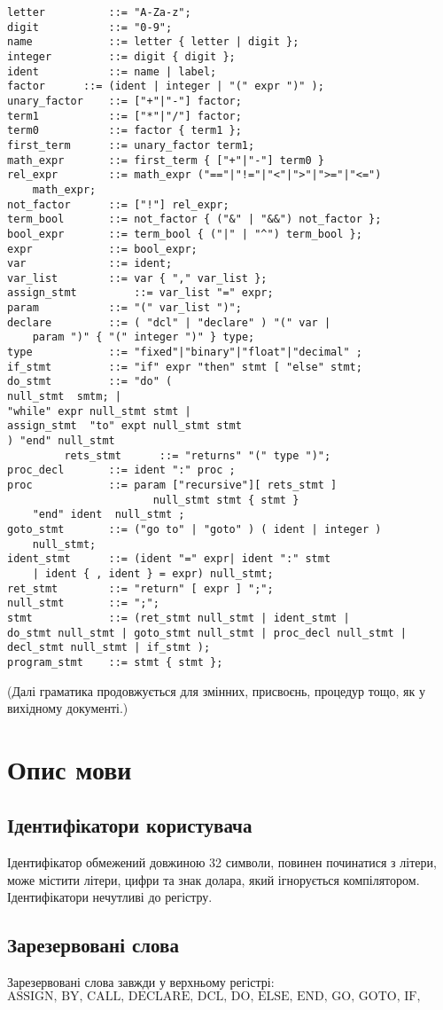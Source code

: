 \documentclass{memoir}
\begin{document}
\begin{lstlisting}
letter			::= "A-Za-z";
digit 			::= "0-9";
name 			::= letter { letter | digit };
integer 		::= digit { digit };
ident 			::= name | label;
factor 		::= (ident | integer | "(" expr ")" );
unary_factor 	::= ["+"|"-"] factor;
term1 			::= ["*"|"/"] factor;
term0 			::= factor { term1 };
first_term 		::= unary_factor term1;
math_expr 		::= first_term { ["+"|"-"] term0 }
rel_expr 		::= math_expr ("=="|"!="|"<"|">"|">="|"<=") 
    math_expr;
not_factor 		::= ["!"] rel_expr;
term_bool 		::= not_factor { ("&" | "&&") not_factor };
bool_expr 		::= term_bool { ("|" | "^") term_bool };
expr 			::= bool_expr;
var 			::= ident;
var_list 		::= var { "," var_list };
assign_stmt 		::= var_list "=" expr;
param 			::= "(" var_list ")";
declare 		::= ( "dcl" | "declare" ) "(" var |
    param ")" { "(" integer ")" } type;
type			::= "fixed"|"binary"|"float"|"decimal" ;
if_stmt 		::= "if" expr "then" stmt [ "else" stmt;
do_stmt 		::= "do" (
null_stmt  smtm; |
"while" expr null_stmt stmt |
assign_stmt  "to" expt null_stmt stmt
) "end" null_stmt
	     rets_stmt		::= "returns" "(" type ")";
proc_decl 		::= ident ":" proc ;
proc 			::= param ["recursive"][ rets_stmt ]
                       null_stmt stmt { stmt }
    "end" ident  null_stmt ;
goto_stmt 		::= ("go to" | "goto" ) ( ident | integer ) 
    null_stmt;
ident_stmt 		::= (ident "=" expr| ident ":" stmt
    | ident { , ident } = expr) null_stmt;
ret_stmt 		::= "return" [ expr ] ";";
null_stmt 		::= ";";
stmt 			::= (ret_stmt null_stmt | ident_stmt |
do_stmt null_stmt | goto_stmt null_stmt | proc_decl null_stmt |
decl_stmt null_stmt | if_stmt );
program_stmt  	::= stmt { stmt };
\end{lstlisting}

(Далі граматика продовжується для змінних, присвоєнь, процедур тощо, як у вихідному документі.)

\section{Опис мови}
\subsection{Ідентифікатори користувача}
Ідентифікатор обмежений довжиною 32 символи, повинен починатися з літери, може містити літери, цифри та знак долара, який ігнорується компілятором. Ідентифікатори нечутливі до регістру.

\subsection{Зарезервовані слова}
Зарезервовані слова завжди у верхньому регістрі:
\[
\text{ASSIGN, BY, CALL, DECLARE, DCL, DO, ELSE, END, GO, GOTO, IF, INITIAL, LABEL, LITERALLY, OPTIONS, PROCEDURE, PROC, RECURSIVE, RETURNS, RETURN, THEN, TO, WHILE, CASE}
\]
\end{document}
